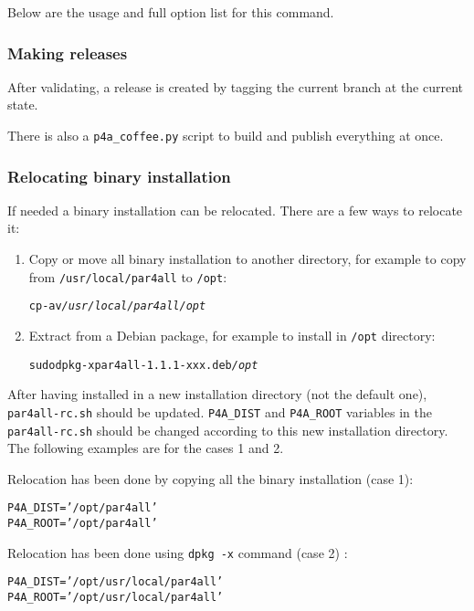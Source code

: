 \documentclass[a4paper]{article}
\begin{document}
Below are the usage and full option list for this command.





\subsubsection{Making releases}
\label{sec:releases}

After validating, a release is created by tagging the current branch
at the current state.

There is also a \verb|p4a_coffee.py| script to build and publish everything
at once.



\subsubsection{Relocating binary installation}
\label{sec:relocation}
If needed a \Apfa binary installation can be relocated. There are a few ways to relocate it:

\begin{enumerate}
\item Copy or move all \Apfa binary installation to another directory, for
  example to copy from \texttt{/usr/local/par4all} to \texttt{/opt}:
\begin{alltt}
cp -av \emph{/usr/local/par4all} \emph{/opt}
\end{alltt}

\item Extract from a Debian package, for example to install
  \Apfa in \texttt{/opt} directory:
\begin{alltt}
sudo dpkg -x par4all-1.1.1-xxx.deb \emph{/opt}
\end{alltt}

\end{enumerate}

After having installed \Apfa in a new installation directory (not the
default one), \verb|par4all-rc.sh| should be updated.  \verb|P4A_DIST| and
\verb|P4A_ROOT| variables in the \verb|par4all-rc.sh| should be changed
according to this new installation directory.  The following examples are
for the cases 1 and 2.

Relocation has been done by copying all the binary installation (case 1):
\begin{alltt}
P4A_DIST='/opt/par4all'
P4A_ROOT='/opt/par4all'
\end{alltt}

Relocation has been done using \texttt{dpkg -x} command (case 2) :
\begin{alltt}
P4A_DIST='/opt/usr/local/par4all'
P4A_ROOT='/opt/usr/local/par4all'
\end{alltt}
\end{document}
